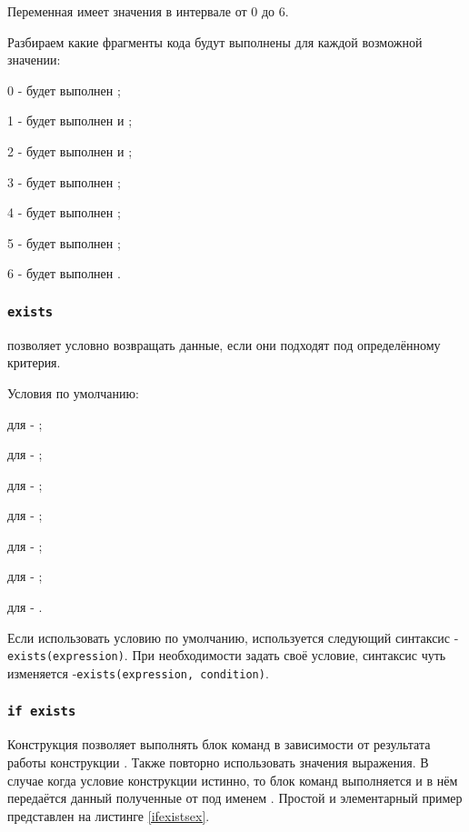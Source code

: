 Переменная  имеет значения в интервале от 0 до 6.

Разбираем какие фрагменты кода будут выполнены для каждой возможной значении:
\begin{icItems}
	\item 0 - будет выполнен ;
	\item 1 - будет выполнен  и ;
	\item 2 - будет выполнен  и ;
	\item 3 - будет выполнен ;
	\item 4 - будет выполнен ;
	\item 5 - будет выполнен ;
	\item 6 - будет выполнен .
\end{icItems}

\subsubsection{\lstinline|exists|}

 позволяет условно возвращать данные, если они подходят под определённому критерия.

Условия по умолчанию:
\begin{icItems}
\item
	для \bool{} - ;
\item
	для \integer{} - ;
\item
	для \double{} - ;
\item
	для \str{} - ;
\item
	для \listtype{} - ;
\item
	для \set{} - ;
\item
	для \element{} - .
\end{icItems}

Если использовать условию по умолчанию, используется следующий синтаксис - \lstinline|exists(expression)|.
При необходимости задать своё условие, синтаксис чуть изменяется -\lstinline|exists(expression, condition)|.

\subsubsection{\lstinline|if exists|}

Конструкция  позволяет выполнять блок команд в зависимости от результата работы конструкции . Также повторно использовать значения выражения. В случае когда условие конструкции  истинно, то блок команд выполняется и в нём передаётся данный полученные от  под именем .
Простой и элементарный пример представлен на листинге \ref{ifexistsex}.

